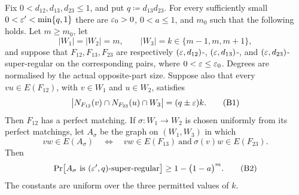 \begin{lemma}\label{lem:addendum-near-equal-four-graphs}
Fix $0<d_{12},d_{13},d_{23}\leq1$, and put
$q\coloneqq d_{13}d_{23}$.  For every sufficiently small
$0<\varepsilon'<\min\{q,1\}$ there are $\varepsilon_0>0$, $0<a\leq1$, and $m_0$ such that the
following holds.  Let $m\geq m_0$, let
\[
  |W_1|=|W_2|=m,
  \qquad |W_3|=k\in\{m-1,m,m+1\},
\]
and suppose that $F_{12},F_{13},F_{23}$ are respectively
$(\varepsilon,d_{12})$-, $(\varepsilon,d_{13})$-, and
$(\varepsilon,d_{23})$-super-regular on the corresponding pairs, where
$0<\varepsilon\leq\varepsilon_0$.  Degrees are normalised by the actual opposite-part
size.  Suppose also that every $vu\in E(F_{12})$, with $v\in W_1$ and
$u\in W_2$, satisfies
\[
 \bigl|N_{F_{13}}(v)\cap N_{F_{23}}(u)\cap W_3\bigr|
      =(q\pm\varepsilon)k.                                  \tag{B1}
\]
Then $F_{12}$ has a perfect matching.  If $\sigma:W_1\to W_2$ is chosen
uniformly from its perfect matchings, let $A_\sigma$ be the graph on
$(W_1,W_3)$ in which
\[
 vw\in E(A_\sigma)
 \quad\Longleftrightarrow\quad
 vw\in E(F_{13})\ \text{and}\ \sigma(v)w\in E(F_{23}).
\]
Then
\[
 \Pr\bigl[A_\sigma\text{ is }(\varepsilon',q)\text{-super-regular}\bigr]
      \geq1-\bigl(1-a\bigr)^{m}.                     \tag{B2}
\]
The constants are uniform over the three permitted values of $k$.
\end{lemma}


